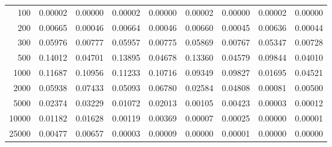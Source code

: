 \begin{table}[ht]
\begin{tabular}{r|c|c|c|c|c|c|c|c}
    100   & 0.00002 & 0.00000 & 0.00002 & 0.00000 & 0.00002 & 0.00000 & 0.00002 & 0.00000 \\
    200   & 0.00665 & 0.00046 & 0.00664 & 0.00046 & 0.00660 & 0.00045 & 0.00636 & 0.00044 \\
    300   & 0.05976 & 0.00777 & 0.05957 & 0.00775 & 0.05869 & 0.00767 & 0.05347 & 0.00728 \\
    500   & 0.14012 & 0.04701 & 0.13895 & 0.04678 & 0.13360 & 0.04579 & 0.09844 & 0.04010 \\
    1000  & 0.11687 & 0.10956 & 0.11233 & 0.10716 & 0.09349 & 0.09827 & 0.01695 & 0.04521 \\
    2000  & 0.05938 & 0.07433 & 0.05093 & 0.06780 & 0.02584 & 0.04808 & 0.00081 & 0.00500 \\
    5000  & 0.02374 & 0.03229 & 0.01072 & 0.02013 & 0.00105 & 0.00423 & 0.00003 & 0.00012 \\
    10000 & 0.01182 & 0.01628 & 0.00119 & 0.00369 & 0.00007 & 0.00025 & 0.00000 & 0.00001 \\
    25000 & 0.00477 & 0.00657 & 0.00003 & 0.00009 & 0.00000 & 0.00001 & 0.00000 & 0.00000 \\ \cline{1-9}
    \end{tabular}
    \label{tab:XRayEffOCX}
\end{table}

